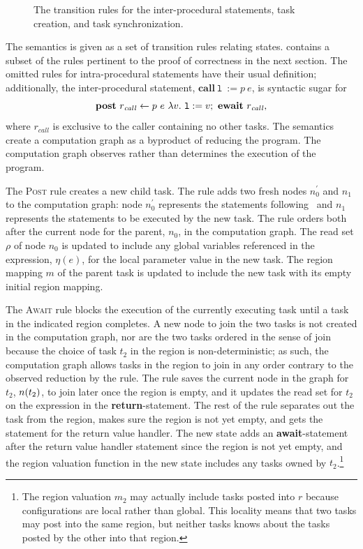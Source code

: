 \begin{figure}
\begin{center}
\begin{mathpar}
\end{mathpar}
  \end{center}
  \caption{The transition rules for the inter-procedural statements, task creation, and task synchronization.}
  \label{fig:inter}
    \label{fig:semantics}
\end{figure}

The semantics is given as a set of transition rules relating states.
 contains a subset of the rules pertinent to the
proof of correctness in the next section. The omitted rules for
intra-procedural statements have their usual definition; additionally, the
inter-procedural statement, $\textbf{call}~\texttt{l}\ := p~e$, is
syntactic sugar for
\[
\post~r_\mathit{call}\leftarrow p~e~\lamdefe{v}{\texttt{l} := v};~
\ewait~r_\mathit{call},
\]
where $r_{call}$ is exclusive to the caller containing no other tasks. The semantics create a computation graph as a byproduct of reducing the program. The computation graph observes rather than determines the execution of the program. 

The \textsc{Post} rule creates a new child task. The rule adds two
fresh nodes $n_0^\prime$ and $n_1$ to the computation graph: node
$n_0^\prime$ represents the statements following \post\ and $n_1$
represents the statements to be executed by the new task. The rule
orders both after the current node for the parent, $n_0$, in the
computation graph.  The read set $\rho$ of node $n_0$ is updated to
include any global variables referenced in the expression,
$\eta\left(e\right)$, for the local parameter value in the new
task. The region mapping $m$ of the parent task is updated to include
the new task with its empty initial region mapping.


The \textsc{Await} rule blocks the execution of the currently
executing task until a task in the indicated region completes.  A new
node to join the two tasks is not created in the computation graph,
nor are the two tasks ordered in the sense of join because the choice
of task $t_2$ in the region is non-deterministic; as such, the
computation graph allows tasks in the region to join in any order
contrary to the observed reduction by the rule. The rule saves the
current node in the graph for $t_2$, $\node(t_2)$, to join later once
the region is empty, and it updates the read set for $t_2$ on the
expression in the \textbf{return}-statement. The rest of the rule
separates out the task from the region, makes sure the region is not
yet empty, and gets the statement for the return value handler. The
new state adds an \textbf{await}-statement after the return value
handler statement since the region is not yet empty, and the region
valuation function in the new state includes any tasks owned by
$t_2$.\footnote{The region valuation $m_2$ may actually include tasks
  posted into $r$ because configurations are local rather than
  global. This locality means that two tasks may post into the same
  region, but neither tasks knows about the tasks posted by the other
  into that region.}


